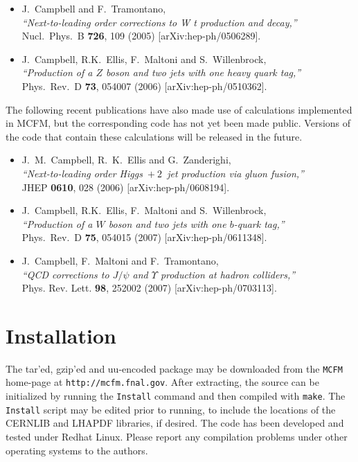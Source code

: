 \documentclass[12pt]{article}
\begin{document}
\begin{itemize}
  {\it ``Single top production and decay at next-to-leading order,''} \\
  Phys.\ Rev.\ D {\bf 70}, 094012 (2004)
  [arXiv:hep-ph/0408158].
\item J.~Campbell and F.~Tramontano, \\
  {\it ``Next-to-leading order corrections to W t production and
  decay,''} \\
  Nucl.\ Phys.\ B {\bf 726}, 109 (2005)
  [arXiv:hep-ph/0506289].
\item J.~Campbell, R.K.~Ellis, F.~Maltoni and S.~Willenbrock, \\
  {\it ``Production of a $Z$ boson and two jets with one heavy
  quark tag,''} \\
  Phys.\ Rev.\ D {\bf 73}, 054007 (2006)
  [arXiv:hep-ph/0510362].
\end{itemize}

The following recent publications have also made use of calculations
implemented in MCFM, but the corresponding code has not yet been made
public. Versions of the code that contain these calculations will be
released in the future.

\begin{itemize}
\item J.~M.~Campbell, R.~K.~Ellis and G.~Zanderighi, \\
  {\it ``Next-to-leading order Higgs~$+~2$~jet production via
  gluon fusion,''} \\
  JHEP {\bf 0610}, 028 (2006)
  [arXiv:hep-ph/0608194].
\item J.~Campbell, R.K.~Ellis, F.~Maltoni and S.~Willenbrock, \\
  {\it ``Production of a $W$ boson and two jets with one $b$-quark
  tag,''} \\
  Phys.\ Rev.\ D {\bf 75}, 054015 (2007)
  [arXiv:hep-ph/0611348].
\item J.~Campbell, F.~Maltoni and F.~Tramontano, \\
  {\it ``QCD corrections to $J/\psi$ and $\Upsilon$ production
  at hadron colliders,''} \\
  Phys. Rev. Lett. {\bf 98}, 252002 (2007)
  [arXiv:hep-ph/0703113].
\end{itemize}

\section{Installation}

The tar'ed, gzip'ed and uu-encoded package may be downloaded from
the {\tt MCFM} home-page at {\tt http://mcfm.fnal.gov}.
After extracting, the source can be initialized by running the
{\tt Install} command and then compiled with {\tt make}. The
{\tt Install} script may be edited prior to running, to include
the locations of the CERNLIB and LHAPDF libraries, if desired.
The code has been developed and tested under Redhat Linux. Please report
any compilation problems under other operating systems to the authors.
\end{document}

